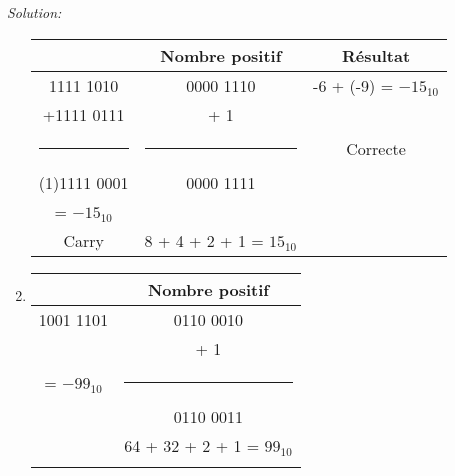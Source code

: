 \documentclass{article}
\newenvironment{solution}
    {\textit{Solution:}}
    {}
\begin{document}
\begin{solution}
\begin{enumerate}
        \begin{tabular}{|c|c|c|}
        \hline
        & Nombre positif & Résultat \\
        \hline
        \hspace{6pt}1111 1010       &     0000 1110         &       -6 + (-9) = $-15_{10}$         \\
        +1111 0111                  &     + \hspace{25pt} 1               &                                         \\
        \rule{1in}{1pt}             &      \rule{1in}{1pt}            &       Correcte                          \\
        (1)1111 0001                &     0000 1111         &                                         \\
        \hspace{33pt} = $-15_{10}$ \hspace{30pt}  &       &                                   \\
        Carry                       &8 + 4 + 2 + 1 = $15_{10}$&      \hspace{100pt}                     \\
        \hline
        \end{tabular}
        
        
        
        
        \item
        
        
        \begin{tabular}{|c|c|}
        \hline
        & Nombre positif\\
        \hline    
        1001 1101           &       0110 0010                   \\
        \hspace{101pt}      &       + \hspace{25pt} 1           \\
        = $-99_{10}$         &       \rule{1in}{1pt}             \\
        \hspace{5pt}        &       0110 0011                   \\
        \hspace{5pt}        &       64 + 32 + 2 + 1 = $99_{10}$            \\
                            &       \hspace{100pt}              \\
        \hline
        \end{tabular}
        

\end{enumerate}
\end{solution}
\end{document}
